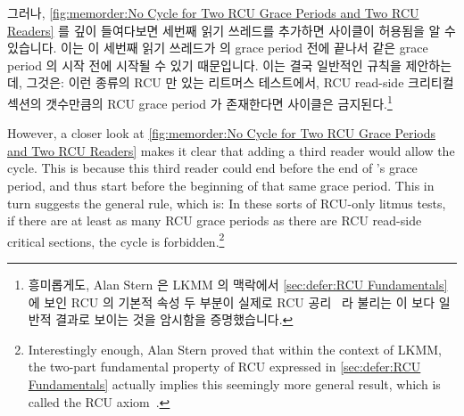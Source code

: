 그러나,
\cref{fig:memorder:No Cycle for Two RCU Grace Periods and Two RCU Readers}
를 깊이 들여다보면 세번째 읽기 쓰레드를 추가하면 사이클이 허용됨을 알 수
있습니다.
이는 이 세번째 읽기 쓰레드가  의 grace period 전에 끝나서 같은 grace
period 의 시작 전에 시작될 수 있기 때문입니다.
이는 결국 일반적인 규칙을 제안하는데, 그것은:  이런 종류의 RCU 만 있는 리트머스
테스트에서, RCU read-side 크리티컬 섹션의 갯수만큼의 RCU grace period 가
존재한다면 사이클은 금지된다.\footnote{
	흥미롭게도, Alan Stern 은 LKMM 의 맥락에서
	\cref{sec:defer:RCU Fundamentals} 에 보인 RCU 의 기본적 속성 두 부분이
	실제로 RCU 공리~\cite{Alglave:2018:FSC:3173162.3177156} 라 불리는 이
	보다 일반적 결과로 보이는 것을 암시함을 증명했습니다.}

\iffalse

However, a closer look at
\cref{fig:memorder:No Cycle for Two RCU Grace Periods and Two RCU Readers}
makes it clear that adding a third reader would allow the cycle.
This is because this third reader could end before the end of 's
grace period, and thus start before the beginning of that same grace
period.
This in turn suggests the general rule, which is:  In these sorts of RCU-only
litmus tests, if there are at least as many RCU grace periods as there
are RCU read-side critical sections, the cycle is forbidden.\footnote{
	Interestingly enough, Alan Stern proved that within the context
	of LKMM, the two-part fundamental property of RCU expressed
	in \cref{sec:defer:RCU Fundamentals} actually implies
	this seemingly more general result, which is called the RCU
	axiom~\cite{Alglave:2018:FSC:3173162.3177156}.}

